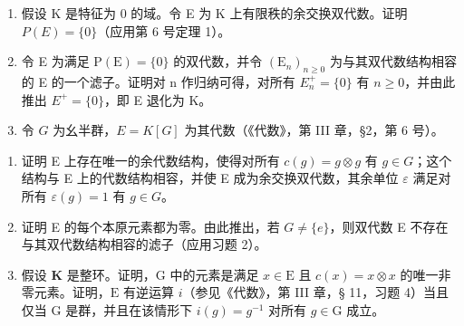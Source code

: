 
\begin{enumerate}
\def\labelenumi{\arabic{enumi}.}
\item
  假设 K 是特征为 0 的域。令 E 为 K 上有限秩的余交换双代数。证明 \(P(E) = \{0\}\)（应用第 6 号定理 1）。
\item
  令 E 为满足 \(\mathrm{P}(\mathrm{E})=\{0\}\) 的双代数，并令 \((\mathrm{E}_{n})_{n\geqslant0}\) 为与其双代数结构相容的 E 的一个滤子。证明对 n 作归纳可得，对所有 \(E_{n}^{+}=\{0\}\) 有 \(n\geqslant0\)，并由此推出 \(E^{+}=\{0\}\)，即 E 退化为 K。
\item
  令 \(G\) 为幺半群，\(E = K[G]\) 为其代数（《代数》，第 III 章，§2，第 6 号）。
\end{enumerate}

\begin{enumerate}
\def\labelenumi{(\alph{enumi})}
\item
  证明 E 上存在唯一的余代数结构，使得对所有 \(c(g) = g \otimes g\) 有 \(g \in G\)；这个结构与 E 上的代数结构相容，并使 E 成为余交换双代数，其余单位 \(\varepsilon\) 满足对所有 \(\varepsilon(g) = 1\) 有 \(g \in G\)。
\item
  证明 E 的每个本原元素都为零。由此推出，若 \(G \neq \{e\}\)，则双代数 E 不存在与其双代数结构相容的滤子（应用习题 2）。
\item
  假设 \(\mathbf{K}\) 是整环。证明，\(\mathrm{G}\) 中的元素是满足 \(x\in \mathrm{E}\) 且 \(c(x) = x\otimes x\) 的唯一非零元素。证明，\(\mathrm{E}\) 有逆运算 \(i\)（参见《代数》，第 III 章，§ 11，习题 4）当且仅当 \(\mathrm{G}\) 是群，并且在该情形下 \(i(g) = g^{-1}\) 对所有 \(g\in \mathrm{G}\) 成立。
\end{enumerate}

